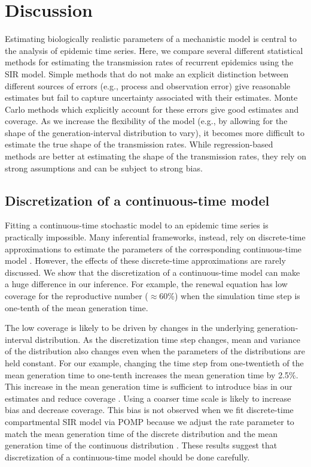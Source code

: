 \documentclass{article}
\begin{document}
\section{Discussion}

Estimating biologically realistic parameters of a mechanistic model is central to the analysis of epidemic time series.
Here, we compare several different statistical methods for estimating the transmission rates of recurrent epidemics using the SIR model.
Simple methods that do not make an explicit distinction between different sources of errors (e.g., process and observation error) give reasonable estimates but fail to capture uncertainty associated with their estimates.
Monte Carlo methods which explicitly account for these errors give good estimates and coverage.
As we increase the flexibility of the model (e.g., by allowing for the shape of the generation-interval distribution to vary), it becomes more difficult to estimate the true shape of the transmission rates.
While regression-based methods are better at estimating the shape of the transmission rates, they rely on strong assumptions and can be subject to strong bias.

\subsection{Discretization of a continuous-time model}

Fitting a continuous-time stochastic model to an epidemic time series is practically impossible.
Many inferential frameworks, instead, rely on discrete-time approximations to estimate the parameters of the corresponding continuous-time model \citep{finkenstadt2002stochastic, king2015statistical, champredon2018two, li2018fitting}.
However, the effects of these discrete-time approximations are rarely discussed.
We show that the discretization of a continuous-time model can make a huge difference in our inference.
For example, the renewal equation has low coverage for the reproductive number ($\approx 60\%$) when the simulation time step is one-tenth of the mean generation time.

The low coverage is likely to be driven by changes in the underlying generation-interval distribution.
As the discretization time step changes, mean and variance of the distribution also changes even when the parameters of the distributions are held constant.
For our example, changing the time step from one-twentieth of the mean generation time to one-tenth increases the mean generation time by 2.5\%.
This increase in the mean generation time is sufficient to introduce bias in our estimates and reduce coverage \citep{wallinga2006generation}.
Using a coarser time scale is likely to increase bias and decrease coverage.
This bias is not observed when we fit discrete-time compartmental SIR model via POMP because we adjust the rate parameter to match the mean generation time of the discrete distribution and the mean generation time of the continuous distribution \citep{he2009plug}.
These results suggest that discretization of a continuous-time model should be done carefully.
\end{document}
